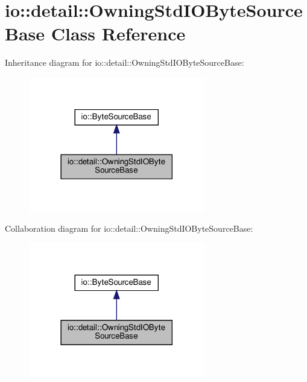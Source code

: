 \hypertarget{classio_1_1detail_1_1OwningStdIOByteSourceBase}{}\section{io\+:\+:detail\+:\+:Owning\+Std\+I\+O\+Byte\+Source\+Base Class Reference}
\label{classio_1_1detail_1_1OwningStdIOByteSourceBase}


Inheritance diagram for io\+:\+:detail\+:\+:Owning\+Std\+I\+O\+Byte\+Source\+Base\+:\nopagebreak
\begin{figure}[H]
\begin{center}
\leavevmode
\includegraphics[width=218pt]{classio_1_1detail_1_1OwningStdIOByteSourceBase__inherit__graph}
\end{center}
\end{figure}


Collaboration diagram for io\+:\+:detail\+:\+:Owning\+Std\+I\+O\+Byte\+Source\+Base\+:\nopagebreak
\begin{figure}[H]
\begin{center}
\leavevmode
\includegraphics[width=218pt]{classio_1_1detail_1_1OwningStdIOByteSourceBase__coll__graph}
\end{center}
\end{figure}
